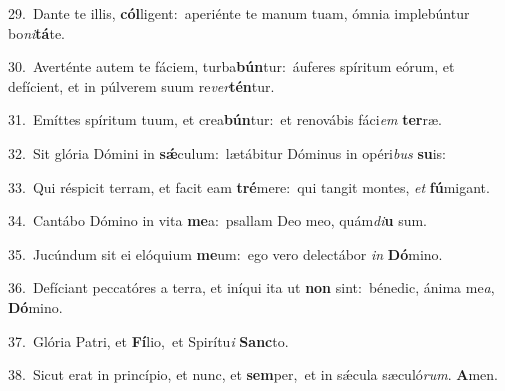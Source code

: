 {\numbfont\textcolor{\numbcolor}{29.}}~Dante te illis, \textbf{cól}\-ligent:~\star aperiénte te manum tuam, ómnia implebúntur bo\-\textit{ni}\-\textbf{tá}te.\par
{\numbfont\textcolor{\numbcolor}{30.}}~Averténte autem te fáciem, turba\-\textbf{bún}\-tur:~\star áuferes spíritum eórum, et defícient, et in púlverem suum re\-\textit{ver}\-\textbf{tén}tur.\par
{\numbfont\textcolor{\numbcolor}{31.}}~Emíttes spíritum tuum, et crea\-\textbf{bún}\-tur:~\star et renovábis fáci\textit{em} \textbf{ter}\-ræ.\par
{\numbfont\textcolor{\numbcolor}{32.}}~Sit glória Dómini in \textbf{sǽ}\-culum:~\star lætábitur Dóminus in opéri\textit{bus} \textbf{su}\-is:\par
{\numbfont\textcolor{\numbcolor}{33.}}~Qui réspicit terram, et facit eam \textbf{tré}\-mere:~\star qui tangit montes, \textit{et} \textbf{fú}\-migant.\par
{\numbfont\textcolor{\numbcolor}{34.}}~Cantábo Dómino in vita \textbf{me}\-a:~\star psallam Deo meo, quám\-\textit{di}\-\textbf{u} sum.\par
{\numbfont\textcolor{\numbcolor}{35.}}~Jucúndum sit ei elóquium \textbf{me}\-um:~\star ego vero delectábor \textit{in} \textbf{Dó}\-mino.\par
{\numbfont\textcolor{\numbcolor}{36.}}~Defíciant peccatóres a terra, et iníqui ita ut \textbf{non} sint:~\star bénedic, ánima me\-\textit{a}\-, \textbf{Dó}\-mino.\par
{\numbfont\textcolor{\numbcolor}{37.}}~Glória Patri, et \textbf{Fí}\-lio,~\star et Spirítu\textit{i} \textbf{Sanc}\-to.\par
{\numbfont\textcolor{\numbcolor}{38.}}~Sicut erat in princípio, et nunc, et \textbf{sem}\-per,~\star et in sǽcula sæculó\-\textit{rum}\-. \textbf{A}\-men.\par

